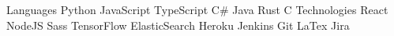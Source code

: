 

\begin{cvskills}

    
    \cvskill
        {Languages} %
        {
        Python{\enskip\cdotp\enskip}
        JavaScript{\enskip\cdotp\enskip}
        TypeScript{\enskip\cdotp\enskip}
        C\#{\enskip\cdotp\enskip}
        Java{\enskip\cdotp\enskip}
        Rust{\enskip\cdotp\enskip}
        C
        }
    \cvskill
        {Technologies}
        {
        React{\enskip\cdotp\enskip}
        NodeJS{\enskip\cdotp\enskip}
        Sass{\enskip\cdotp\enskip}
        TensorFlow{\enskip\cdotp\enskip}
        ElasticSearch{\enskip\cdotp\enskip}
        Heroku{\enskip\cdotp\enskip}
        Jenkins{\enskip\cdotp\enskip}
        Git{\enskip\cdotp\enskip}
        LaTex{\enskip\cdotp\enskip}
        Jira
        }

\end{cvskills}